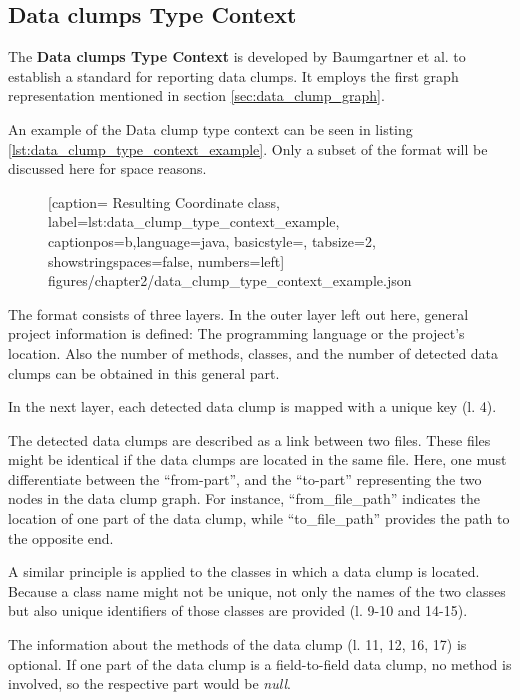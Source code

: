   
\clearpage
\subsection{ Data clumps Type Context }\label{sec:data_clump_format}

The \textbf{Data clumps Type Context} \cite{dataclump_type_context} is developed by Baumgartner et al. to establish a standard for reporting data clumps. It employs the first graph representation mentioned in section \ref{sec:data_clump_graph}.

An example of the Data clump type context can be seen in listing \ref{lst:data_clump_type_context_example}. Only a subset of the format will be discussed here for space reasons.

  \begin{figure} [htbp!]
			
			[caption={ Resulting Coordinate class},
			label={lst:data_clump_type_context_example},
			captionpos=b,language=java, basicstyle=\footnotesize, tabsize=2, showstringspaces=false,  numbers=left]
			{figures/chapter2/data_clump_type_context_example.json}
		\end{figure}

The format consists of three layers. In the outer layer left out here, general project information is defined: The programming language or the project's location. Also the number of methods, classes, and the number of detected data clumps can be obtained in this general part. 

In the next layer, each detected data clump is mapped with a unique key (l. 4).

The detected data clumps are described as a link between two files. These files might be identical if the data clumps are located in the same file. Here, one must differentiate between the \enquote{from-part}, and the \enquote{to-part} representing the two nodes in the data clump graph. For instance, \enquote{from\_file\_path} indicates the location of one part of the data clump, while \enquote{to\_file\_path} provides the path to the opposite end. 

A similar principle is applied to the classes in which a data clump is located. Because a class name might not be unique, not only the names of the two classes but also unique identifiers of those classes are provided (l. 9-10 and 14-15).

The information about the methods of the data clump (l. 11, 12, 16, 17) is optional. If one part of the data clump is a field-to-field data clump, no method is involved, so the respective part would be \textit{null}.

